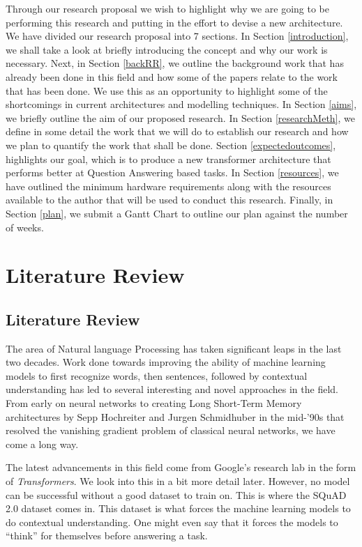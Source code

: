 \documentclass[12pt]{report}
\begin{document}
    Through our research proposal we wish to highlight why we are going to be performing this research and putting in the effort to devise a new architecture. We have divided our research proposal into 7 sections. In Section \ref{introduction}, we shall take a look at briefly introducing the concept and why our work is necessary. Next, in Section \ref{backRR}, we outline the background work that has already been done in this field and how some of the papers relate to the work that has been done. We use this as an opportunity to highlight some of the shortcomings in current architectures and modelling techniques. In Section \ref{aims}, we briefly outline the aim of our proposed research. In Section \ref{researchMeth}, we define in some detail the work that we will do to establish our research and how we plan to quantify the work that shall be done. Section \ref{expectedoutcomes}, highlights our goal, which is to produce a new transformer architecture that performs better at Question Answering based tasks.
    In Section \ref{resources}, we have outlined the minimum hardware requirements along with the resources available to the author that will be used to conduct this research. Finally, in Section \ref{plan}, we submit a Gantt Chart to outline our plan against the number of weeks.
    \chapter{\centering Literature Review}\label{c2}
    \section{Literature Review}\label{c21}
    The area of Natural language Processing has taken significant leaps in the last two decades. Work done towards improving the ability of machine learning models to first recognize words, then sentences, followed by contextual understanding has led to several interesting and novel approaches in the field. From early on neural networks to creating Long Short-Term Memory architectures \citep{originallstm} by Sepp Hochreiter and Jurgen Schmidhuber in the mid-'90s that resolved the vanishing gradient problem of classical neural networks, we have come a long way.

    The latest advancements in this field come from Google's research lab in the form of \textit{Transformers}. We look into this in a bit more detail later. However, no model can be successful without a good dataset to train on. This is where the SQuAD 2.0 dataset \citep{dataset} comes in. This dataset is what forces the machine learning models to do contextual understanding. One might even say that it forces the models to ``think'' for themselves before answering a task.
\end{document}
